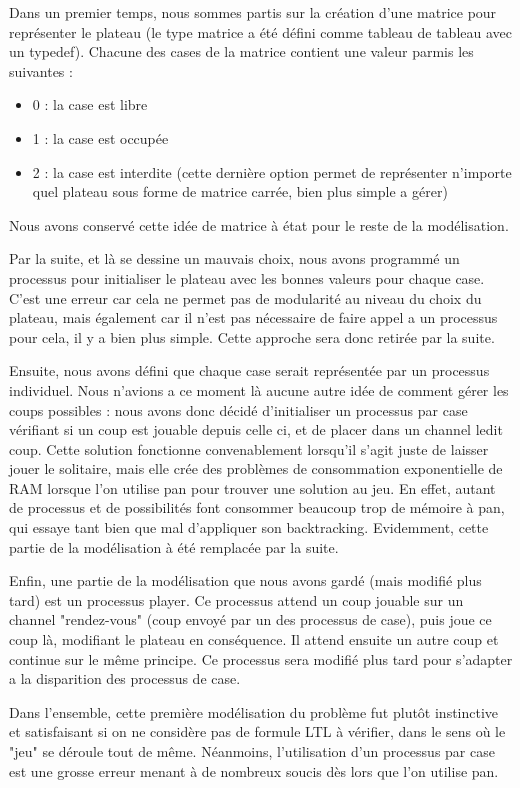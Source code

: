 \documentclass[12pt, a4paper]{report}
\begin{document}
Dans un premier temps, nous sommes partis sur la création d'une matrice pour représenter le plateau (le type matrice a été défini comme tableau de tableau avec un typedef). Chacune des cases de la matrice contient une valeur parmis les suivantes :
\begin{itemize}
\item 0 : la case est libre
\item 1 : la case est occupée
\item 2 : la case est interdite (cette dernière option permet de représenter n'importe quel plateau sous forme de matrice carrée, bien plus simple a gérer)
\end{itemize}
Nous avons conservé cette idée de matrice à état pour le reste de la modélisation.

Par la suite, et là se dessine un mauvais choix, nous avons programmé un processus pour initialiser le plateau avec les bonnes valeurs pour chaque case. C'est une erreur car cela ne permet pas de modularité au niveau du choix du plateau, mais également car il n'est pas nécessaire de faire appel a un processus pour cela, il y a bien plus simple. Cette approche sera donc retirée par la suite.

Ensuite, nous avons défini que chaque case serait représentée par un processus individuel. Nous n'avions a ce moment là aucune autre idée de comment gérer les coups possibles : nous avons donc décidé d'initialiser un processus par case vérifiant si un coup est jouable depuis celle ci, et de placer dans un channel ledit coup. Cette solution fonctionne convenablement lorsqu'il s'agit juste de laisser jouer le solitaire, mais elle crée des problèmes de consommation exponentielle de RAM lorsque l'on utilise pan pour trouver une solution au jeu. En effet, autant de processus et de possibilités font consommer beaucoup trop de mémoire à pan, qui essaye tant bien que mal d'appliquer son backtracking. Evidemment, cette partie de la modélisation à été remplacée par la suite.

Enfin, une partie de la modélisation que nous avons gardé (mais modifié plus tard) est un processus player. Ce processus attend un coup jouable sur un channel "rendez-vous" (coup envoyé par un des processus de case), puis joue ce coup là, modifiant le plateau en conséquence. Il attend ensuite un autre coup et continue sur le même principe. Ce processus sera modifié plus tard pour s'adapter a la disparition des processus de case.

Dans l'ensemble, cette première modélisation du problème fut plutôt instinctive et satisfaisant si on ne considère pas de formule LTL à vérifier, dans le sens où le "jeu" se déroule tout de même. Néanmoins, l'utilisation d'un processus par case est une grosse erreur menant à de nombreux soucis dès lors que l'on utilise pan.
\end{document}
